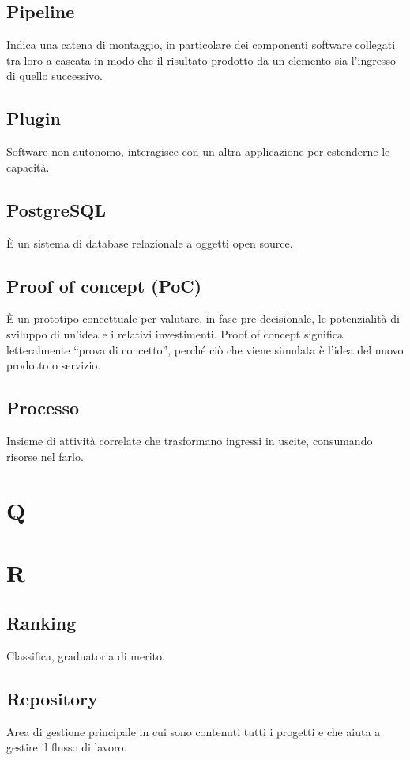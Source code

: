 \documentclass{classes/base}
\begin{document}
        \subsection*{Pipeline}
        Indica una catena di montaggio, in particolare dei componenti software collegati tra loro a cascata in modo che il risultato prodotto da un elemento sia l'ingresso di quello successivo.

        \subsection*{Plugin}
        Software non autonomo, interagisce con un altra applicazione per estenderne le capacità.

        \subsection*{PostgreSQL}
        È un sistema di database relazionale a oggetti open source.

        \subsection*{Proof of concept (PoC)}
        È un prototipo concettuale per valutare, in fase pre-decisionale, le potenzialità di sviluppo di un’idea e i relativi investimenti. Proof of concept significa letteralmente “prova di concetto”, perché ciò che viene simulata è l’idea del nuovo prodotto o servizio.
        
        \subsection*{Processo}
        Insieme di attività correlate che trasformano ingressi in uscite, consumando risorse nel farlo.

        \newpage  
    \section{Q}
    \newpage  
    \section{R}
        \subsection*{Ranking} 
        Classifica, graduatoria di merito. 

        \subsection*{Repository}
        Area di gestione principale in cui sono contenuti tutti i progetti e che aiuta a gestire il flusso di lavoro.
        
\end{document}
